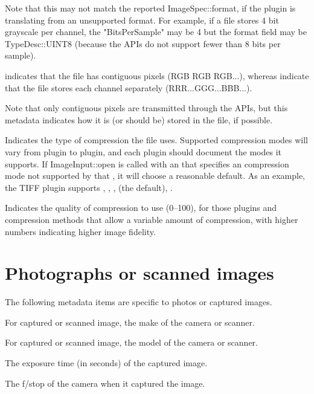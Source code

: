Note that this may not match the reported {\cf ImageSpec::format}, if
the plugin is translating from an unsupported format.  For example, if a
file stores 4 bit grayscale per channel, the {\cf "BitsPerSample"} may
be 4 but the {\cf format} field may be {\cf TypeDesc::UINT8} (because
the \product APIs do not support fewer than 8 bits per sample).
\apiend

 indicates that the file has contiguous pixels (RGB RGB
RGB...), whereas  indicate that the file stores each
channel separately (RRR...GGG...BBB...).

Note that only contiguous pixels are transmitted through the \product
APIs, but this metadata indicates how it is (or should be) stored in the
file, if possible.
\apiend

Indicates the type of compression the file uses.  Supported compression
modes will vary from \ImageInput plugin to plugin, and each plugin
should document the modes it supports.  If {\cf ImageInput::open} is
called with an \ImageSpec that specifies an compression mode not
supported by that \ImageInput, it will choose a reasonable default.
As an example, the TIFF \ImageInput plugin supports ,
, ,  (the default), .
\apiend

Indicates the quality of compression to use (0--100), for those 
plugins and compression methods that allow a variable amount of 
compression, with higher numbers indicating higher image fidelity.
\apiend

\section{Photographs or scanned images}

The following metadata items are specific to photos or captured images.

For captured or scanned image, the make of the camera or scanner.
\apiend

For captured or scanned image, the model of the camera or scanner.
\apiend

The exposure time (in seconds) of the captured image.
\apiend

The f/stop of the camera when it captured the image.
\apiend

